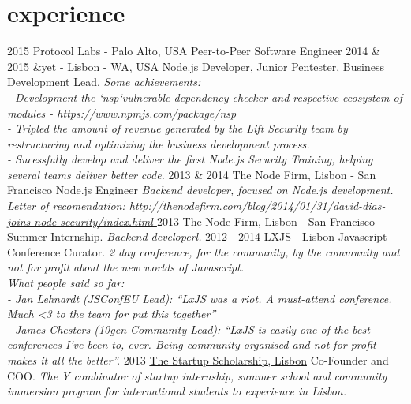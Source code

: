 \documentclass[]{friggeri-cv}
\begin{document}
\section{experience}

\begin{entrylist}
  \entry
    {2015}
    {Protocol Labs - Palo Alto, USA}
    {Peer-to-Peer Software Engineer}
    {\emph{}}
  \entry
    {2014 \& 2015}
    {\&yet - Lisbon -  WA, USA}
    {Node.js Developer, Junior Pentester, Business Development Lead.}
    {\emph{Some achievements:\\
        - Development the `nsp`vulnerable dependency checker and respective ecosystem of modules - https://www.npmjs.com/package/nsp\\
        - Tripled the amount of revenue generated by the Lift Security team by restructuring and optimizing the business development process.\\
        - Sucessfully develop and deliver the first Node.js Security Training, helping several teams deliver better code.}}
  \entry
    {2013 \& 2014}
    {The Node Firm, Lisbon - San Francisco}
    {Node.js Engineer}
    {\emph{Backend developer, focused on Node.js development. Letter of recomendation: \href{http://thenodefirm.com/blog/2014/01/31/david-dias-joins-node-security/index.html}{http://thenodefirm.com/blog/2014/01/31/david-dias-joins-node-security/index.html }}}
  \entry
    {2013}
    {The Node Firm, Lisbon - San Francisco}
    {Summer Internship.}
    {\emph{Backend developerl.}}
  \entry
    {2012 - 2014}
    {LXJS - Lisbon Javascript Conference}
    {Curator.}
    {\emph{2 day conference, for the community, by the community and not for profit about the new worlds of Javascript.\\
    What people said so far: \\
      - Jan Lehnardt (JSConfEU Lead): “LxJS was a riot. A must-attend conference. Much <3 to the team for put this together”\\
      - James Chesters (10gen Community Lead): “LxJS is easily one of the best conferences I’ve been to, ever. Being community  organised and not-for-profit makes it all the better”.}}
  \entry
    {2013}
    {\href{http://startupscholarship.org/}{The Startup Scholarship, Lisbon}}
    {Co-Founder and COO.}
    {\emph{The Y combinator of startup internship, summer school and community immersion program for international students to experience in Lisbon.}}
\end{entrylist}
\end{document}
